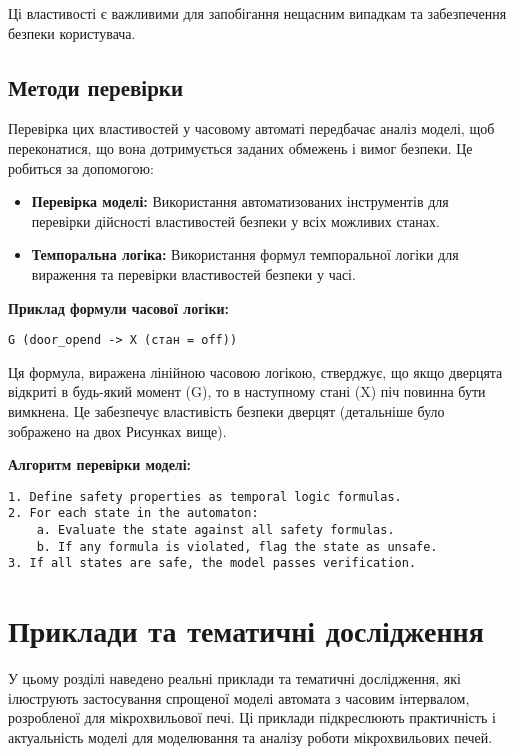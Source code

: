 \documentclass[12pt,a4paper]{article}
\begin{document}
\vspace{0.5cm}

Ці властивості є важливими для запобігання нещасним випадкам та забезпечення безпеки користувача.

\subsection{Методи перевірки}
Перевірка цих властивостей у часовому автоматі передбачає аналіз моделі, щоб переконатися, що вона дотримується заданих обмежень і вимог безпеки. Це робиться за допомогою:
\begin{itemize}
    \item \textbf{Перевірка моделі:} Використання автоматизованих інструментів для перевірки дійсності властивостей безпеки у всіх можливих станах.
    \item \textbf{Темпоральна логіка:} Використання формул темпоральної логіки для вираження та перевірки властивостей безпеки у часі.
\end{itemize}

\vspace{0.5cm}

\textbf{Приклад формули часової логіки:}
\begin{verbatim}
G (door_opend -> X (стан = off))
\end{verbatim}
Ця формула, виражена лінійною часовою логікою, стверджує, що якщо дверцята відкриті в будь-який момент (G), то в наступному стані (X) піч повинна бути вимкнена. Це забезпечує властивість безпеки дверцят (детальніше було зображено на двох Рисунках вище).

\vspace{0.5cm}

\textbf{Алгоритм перевірки моделі:}
\begin{verbatim}
1. Define safety properties as temporal logic formulas.
2. For each state in the automaton:
    a. Evaluate the state against all safety formulas.
    b. If any formula is violated, flag the state as unsafe.
3. If all states are safe, the model passes verification.
\end{verbatim}

\section{Приклади та тематичні дослідження}

У цьому розділі наведено реальні приклади та тематичні дослідження, які ілюструють застосування спрощеної моделі автомата з часовим інтервалом, розробленої для мікрохвильової печі. Ці приклади підкреслюють практичність і актуальність моделі для моделювання та аналізу роботи мікрохвильових печей.
\end{document}
